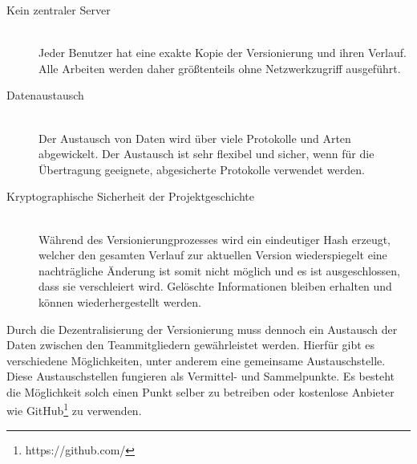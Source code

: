 \begin{description}

\item[Kein zentraler Server] \hfill \\
Jeder Benutzer hat eine exakte Kopie der Versionierung und ihren Verlauf. Alle Arbeiten werden daher größtenteils ohne Netzwerkzugriff ausgeführt.

\item[Datenaustausch] \hfill \\
Der Austausch von Daten wird über viele Protokolle und Arten abgewickelt. Der Austausch ist sehr flexibel und sicher, wenn für die Übertragung geeignete, abgesicherte Protokolle verwendet werden.

\item[Kryptographische Sicherheit der Projektgeschichte] \hfill \\
Während des Versionierungprozesses wird ein eindeutiger Hash erzeugt, welcher den gesamten Verlauf zur aktuellen Version wiederspiegelt eine nachträgliche Änderung ist somit nicht möglich und es ist ausgeschlossen, dass sie verschleiert wird. Gelöschte Informationen bleiben erhalten und können wiederhergestellt werden.
\end{description}

Durch die Dezentralisierung der Versionierung muss dennoch ein Austausch der Daten zwischen den Teammitgliedern gewährleistet werden. Hierfür gibt es verschiedene Möglichkeiten, unter anderem eine gemeinsame Austauschstelle. Diese Austauschstellen fungieren als Vermittel- und Sammelpunkte. Es besteht die Möglichkeit solch einen Punkt selber zu betreiben oder kostenlose Anbieter wie GitHub\footnote{https://github.com/} zu verwenden.